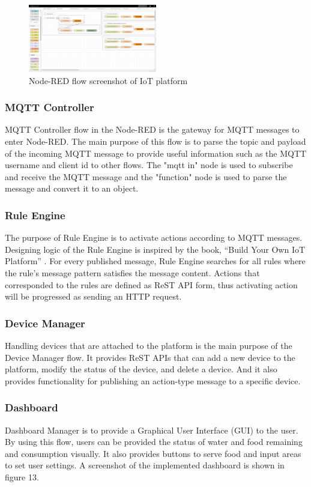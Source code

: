 ﻿\documentclass[conference]{IEEEtran}
\begin{document}
\begin{figure}[htbp]
\centerline{\includegraphics[width=0.5\textwidth]{./images/node-red-platform-screenshot.png}}
\caption{Node-RED flow screenshot of IoT platform}
\label{fig}
\end{figure}

\subsubsection{MQTT Controller}
MQTT Controller flow in the Node-RED is the gateway for MQTT messages to enter Node-RED.
The main purpose of this flow is to parse the topic and payload of the incoming MQTT message to provide useful information such as the MQTT username and client id to other flows.
The "mqtt in" node is used to subscribe and receive the MQTT message and the "function" node is used to parse the message and convert it to an object.

\subsubsection{Rule Engine}
The purpose of Rule Engine is to activate actions according to MQTT messages.
Designing logic of the Rule Engine is inspired by the book, “Build Your Own IoT Platform” \cite{b14}.
For every published message, Rule Engine searches for all rules where the rule’s message pattern satisfies the message content.
Actions that corresponded to the rules are defined as ReST API form, thus activating action will be progressed as sending an HTTP request.

\subsubsection{Device Manager}
Handling devices that are attached to the platform is the main purpose of the Device Manager flow.
It provides ReST APIs that can add a new device to the platform, modify the status of the device, and delete a device.
And it also provides functionality for publishing an action-type message to a specific device.

\subsubsection{Dashboard}
Dashboard Manager is to provide a Graphical User Interface (GUI) to the user.
By using this flow, users can be provided the status of water and food remaining and consumption visually.
It also provides buttons to serve food and input areas to set user settings. A screenshot of the implemented dashboard is shown in figure 13.
\end{document}
